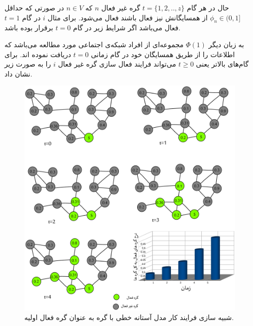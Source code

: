 \begin{persian}
{\centerline{
}


حال در هر گام $t=\{1,2,..,z\}$ گره غیر فعال $n$ که $n \in V$ در صورتی که حداقل $\phi_n \in (0,1]$ از همسایگانش نیز فعال باشند فعال می‌شود. برای مثال $i$ در گام $t=1$ فعال می‌باشد اگر شرایط زیر در گام $t=0$ برقرار بوده باشد.

\centerline{
}

به زبان دیگر $\Phi(1)$ مجموعه‌ای از افراد شبکه‌ی اجتماعی مورد مطالعه می‌باشد که اطلاعات را از طریق همسایگان خود در گام زمانی $t=0$ دریافت نموده اند. برای گام‌های بالاتر یعنی $t \geqslant 0$ می‌تواند فرایند فعال سازی گره غیر فعال $i$ را به صورت زیر نشان داد.

\centerline{
}
}

 \begin{figure}[H]
 \centering
 \includegraphics[scale=0.242]{figures/ltm}
 \caption[مدل آستانه خطی]
 { شبیه سازی فرایند کار مدل آستانه خطی با گره  به عنوان گره فعال اولیه.}
\end{figure}


\end{persian}
